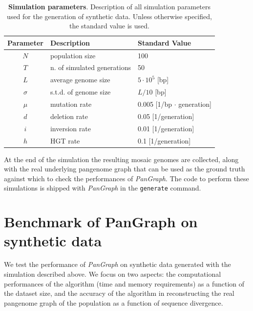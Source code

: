 \documentclass[aps,rmp,reprint,superscriptaddress,notitlepage,10pt,onecolumn]{revtex4-1}
\begin{document}
\begin{table}[hb]
    \begin{tabular}{c l l}
        \hline\hline
        Parameter & Description                 & Standard Value                  \\
        \hline
        $N$       & population size             & 100                             \\
        $T$       & n. of simulated generations & 50                              \\
        $L$       & average genome size         & $5 \cdot 10^5$ [bp]             \\
        $\sigma$  & s.t.d. of genome size       & $L/10$ [bp]                     \\
        $\mu$     & mutation rate               & 0.005 [1/bp $\cdot$ generation] \\
        $d$       & deletion rate               & 0.05 [1/generation]             \\
        $i$       & inversion rate              & 0.01 [1/generation]             \\
        $h$       & HGT rate                    & 0.1 [1/generation]              \\
        \hline
    \end{tabular}
    \caption{{\bf Simulation parameters}. Description of all simulation parameters used for the generation of synthetic data. Unless otherwise specified, the standard value is used.}
    \label{table:sim-params}
\end{table}

At the end of the simulation the resulting mosaic genomes are collected, along with the real underlying pangenome graph that can be used as the ground truth against which to check the performances of \textit{PanGraph}. The code to perform these simulations is shipped with \textit{PanGraph} in the \verb|generate| command.

\section{Benchmark of PanGraph on synthetic data}

We test the performance of \textit{PanGraph} on synthetic data generated with the simulation described above. We focus on two aspects: the computational performances of the algorithm (time and memory requirements) as a function of the dataset size, and the accuracy of the algorithm in reconstructing the real pangenome graph of the population as a function of sequence divergence.
\end{document}
